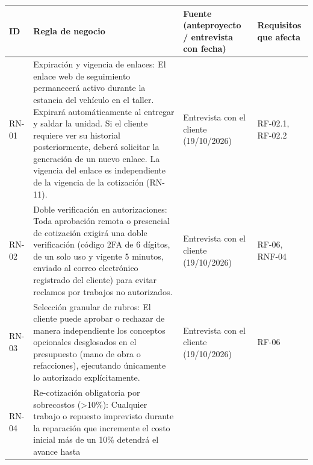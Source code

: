 {\def\LTcaptype{none} %
\begin{longtable}[]{@{}
  >{\raggedright\arraybackslash}p{}
  >{\raggedright\arraybackslash}p{}
  >{\raggedright\arraybackslash}p{}
  >{\raggedright\arraybackslash}p{}@{}}
\toprule\noalign{}
\begin{minipage}[b]{\linewidth}\raggedright
\textbf{ID}
\end{minipage} & \begin{minipage}[b]{\linewidth}\raggedright
\textbf{Regla de negocio}
\end{minipage} & \begin{minipage}[b]{\linewidth}\raggedright
\textbf{Fuente (anteproyecto / entrevista con fecha)}
\end{minipage} & \begin{minipage}[b]{\linewidth}\raggedright
\textbf{Requisitos que afecta}
\end{minipage} \\
\midrule\noalign{}
\endhead
\bottomrule\noalign{}
\endlastfoot
RN-01 & Expiración y vigencia de enlaces: El enlace web de seguimiento
permanecerá activo durante la estancia del vehículo en el taller.
Expirará automáticamente al entregar y saldar la unidad. Si el cliente
requiere ver su historial posteriormente, deberá solicitar la generación
de un nuevo enlace. La vigencia del enlace es independiente de la
vigencia de la cotización (RN-11). & Entrevista con el cliente
(19/10/2026) & RF-02.1, RF-02.2 \\
RN-02 & Doble verificación en autorizaciones: Toda aprobación remota o
presencial de cotización exigirá una doble verificación (código 2FA de 6
dígitos, de un solo uso y vigente 5 minutos, enviado al correo
electrónico registrado del cliente) para evitar reclamos por trabajos no
autorizados. & Entrevista con el cliente (19/10/2026) & RF-06, RNF-04 \\
RN-03 & Selección granular de rubros: El cliente puede aprobar o
rechazar de manera independiente los conceptos opcionales desglosados en
el presupuesto (mano de obra o refacciones), ejecutando únicamente lo
autorizado explícitamente. & Entrevista con el cliente (19/10/2026) &
RF-06 \\
RN-04 & Re-cotización obligatoria por sobrecostos (\textgreater10\%):
Cualquier trabajo o repuesto imprevisto durante la reparación que
incremente el costo inicial más de un 10\% detendrá el avance hasta

\end{longtable}}
